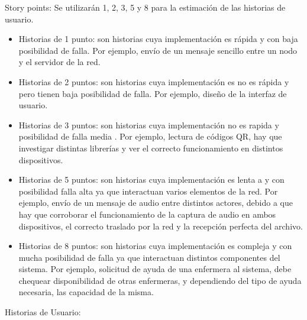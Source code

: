 \documentclass[
11pt, %
]{charter}
\begin{document}
Story points:
Se utilizarán 1, 2, 3, 5 y 8 para la estimación de las historias de usuario.
\begin{itemize}
	\item Historias de 1 punto: son historias cuya implementación es rápida 	y con baja posibilidad de falla. Por ejemplo, envío de un mensaje 			sencillo entre un nodo y el servidor de la red.
	\item Historias de 2 puntos: son historias cuya implementación es no es 	rápida y pero tienen baja posibilidad de falla. Por ejemplo, diseño de la interfaz de usuario.
	\item Historias de 3 puntos: son historias cuya implementación no es rapida y posibilidad de falla media . Por ejemplo, lectura de códigos QR, hay que investigar distintas librerías y ver el correcto funcionamiento en distintos dispositivos.
	\item Historias de 5 puntos: son historias cuya implementación es lenta a y con posibilidad falla alta ya que interactuan varios elementos de la red. Por ejemplo, envío de un mensaje de audio entre distintos actores, debido a que hay que corroborar el funcionamiento de la captura de audio en ambos dispositivos, el correcto traslado por la red y la recepción perfecta del archivo.
	\item Historias de 8 puntos: son historias cuya implementación es compleja y con mucha posibilidad de falla ya que interactuan distintos componentes del sistema. Por ejemplo, solicitud de ayuda de una enfermera al sistema, debe chequear disponibilidad de otras enfermeras, y dependiendo del tipo de ayuda necesaria, las capacidad de la misma.

\end{itemize}

Historias de Usuario:
\end{document}
